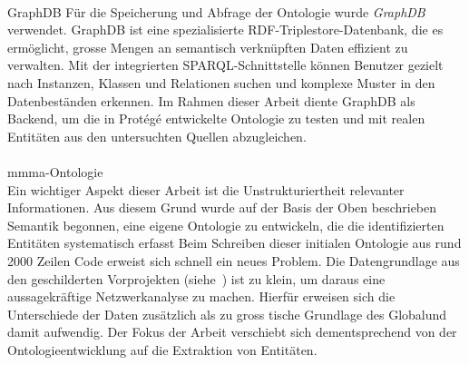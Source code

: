 \documentclass[12pt, a4paper, ngerman, bidi=default]{article}
\makeatletter
\let\oldparagraph\paragraph%
\renewcommand{\paragraph}{
    \@ifstar%
      \xxxParagraphStar%
      \xxxParagraphNoStar%
 }
\newcommand{\xxxParagraphStar}[1]{\oldparagraph*{#1}\mbox{}}
\newcommand{\xxxParagraphNoStar}[1]{\oldparagraph{#1}\mbox{}}
\makeatother
\begin{document}
\paragraph{GraphDB} Für die Speicherung und Abfrage der Ontologie wurde \textit{GraphDB} verwendet. 
GraphDB ist eine spezialisierte RDF-Triplestore-Datenbank, die es ermöglicht, 
grosse Mengen an semantisch verknüpften Daten effizient zu verwalten. 
Mit der integrierten SPARQL-Schnittstelle können Benutzer gezielt nach Instanzen, Klassen und Relationen suchen 
und komplexe Muster in den Datenbeständen erkennen. 
Im Rahmen dieser Arbeit diente GraphDB als Backend, um die in Protégé entwickelte Ontologie zu testen 
und mit realen Entitäten aus den untersuchten Quellen abzugleichen.



\noindent
\begin{minipage}[t]{0.52\textwidth}
  \justifying%
\paragraph{mmma-Ontologie}\\
Ein wichtiger Aspekt dieser Arbeit ist die Unstrukturiertheit relevanter Informationen. 
Aus diesem Grund wurde auf der Basis der Oben beschrieben Semantik begonnen, eine eigene Ontologie zu entwickeln, die die identifizierten Entitäten systematisch erfasst\footnotemark%
Beim Schreiben dieser initialen Ontologie aus rund 2000 Zeilen Code erweist sich schnell ein neues Problem. Die Datengrundlage aus den geschilderten Vorprojekten (siehe~) ist 
zu klein, um daraus eine aussagekräftige Netzwerkanalyse zu machen. Hierfür erweisen sich die Unterschiede der Daten zusätzlich als zu gross tische Grundlage des Globalund damit aufwendig. Der Fokus der Arbeit verschiebt sich dementsprechend von der Ontologieentwicklung 
auf die Extraktion von Entitäten.
\end{minipage}%
\hfill%
\end{document}
